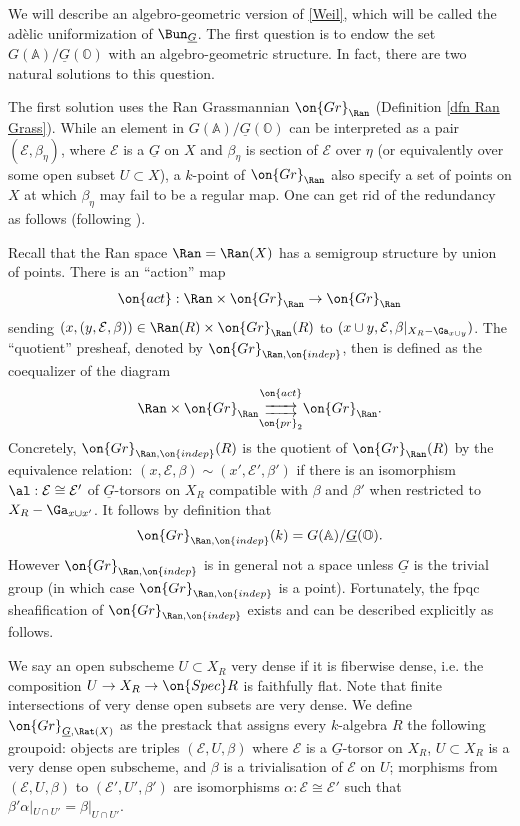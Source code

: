 \documentclass[]{pcmi}
\theoremstyle{plain}
\theoremstyle{remark}
\theoremstyle{definition}
\newcommand{\bA}{{\mathbb A}}
\newcommand{\bO}{{\mathbb O}}
\newcommand{\mE}{{\mathcal E}}
\newcommand{\Gr}{{\on{Gr}}}
\newcommand{\pr}{{\on{pr}}}
\newcommand{\Spec}{\on{Spec}}
\begin{document}
We will describe an algebro-geometric version of \eqref{Weil}, which will be called the ad\`elic uniformization of $\Bun_{\underline G}$. The first question is to endow  the set $G(\bA)/\underline G(\bO)$ with an algebro-geometric structure. In fact, there are two natural solutions to this question.

The first solution uses the Ran Grassmannian $\Gr_{\Ran}$ (Definition \ref{dfn Ran Grass}).  While an element in $G(\bA)/\underline G(\bO)$ can be interpreted as a pair $(\mE,\beta_\eta)$, where $\mE$ is a $\underline G$ on $X$ and $\beta_\eta$ is section of $\mE$ over $\eta$ (or equivalently over some open subset $U\subset X$), a $k$-point of $\Gr_{\Ran}$ also specify a set of points on $X$ at which $\beta_\eta$ may fail to be a regular map. One can get rid of the redundancy as follows (following \cite[\S~2]{Ga3}).

Recall that the Ran space $\Ran=\Ran(X)$ has a semigroup structure by union of points. There is an ``action'' map 
\[\on{act}: \Ran\times \Gr_{\Ran}\to \Gr_{\Ran}\] sending $(x, (y,\mE,\beta))\in \Ran(R)\times\Gr_{\Ran}(R)$ to $(x\cup y, \mE, \beta|_{X_R-\Ga_{x\cup y}})$. The ``quotient'' presheaf, denoted by $\Gr_{\Ran,\on{indep}}$, then is defined as the coequalizer of the diagram
\[\Ran\times\Gr_{\Ran}\substack{\on{act}\\  \xrightarrow{\hspace*{.6cm}} \\[-0.6ex]  \xrightarrow{\hspace*{.6cm}} \\ \pr_2 } \Gr_{\Ran}.\]  
Concretely, $\Gr_{\Ran,\on{indep}}(R)$ is the quotient of $\Gr_{\Ran}(R)$ by the equivalence relation: $(x,\mE,\beta)\sim (x',\mE',\beta')$ if there is an isomorphism $\al: \mE\cong \mE'$ of $\underline G$-torsors on $X_R$ compatible with $\beta$ and $\beta'$ when restricted to $X_R-\Ga_{x\cup x'}$.
It follows by definition that 
$$\Gr_{\Ran,\on{indep}}(k)= G(\bA)/\underline G(\bO).$$ However $\Gr_{\Ran,\on{indep}}$ is in general not a space unless $\underline G$ is the trivial group (in which case $\Gr_{\Ran,\on{indep}}$ is a point). Fortunately, the fpqc sheafification of $\Gr_{\Ran,\on{indep}}$ exists and can be described explicitly as follows.





We say an open subscheme $U\subset X_R$ very dense if it is fiberwise dense, i.e. the composition $U\to X_R\to \Spec R$ is faithfully flat. Note that finite intersections of very dense open subsets are very dense.
We define $\Gr_{\underline G,\Rat(X)}$ as the prestack that assigns every $k$-algebra $R$ the following groupoid: objects are triples $(\mE,U,\beta)$ where $\mE$ is a $\underline G$-torsor on $X_R$, $U\subset X_R$ is a very dense open subscheme, and $\beta$ is a trivialisation of $\mE$ on $U$; morphisms from $(\mE,U,\beta)$ to $(\mE',U',\beta')$ are isomorphisms $\alpha:\mE\cong \mE'$ such that $\beta'\alpha|_{U\cap U'}=\beta|_{U\cap U'}$. 
\end{document}
